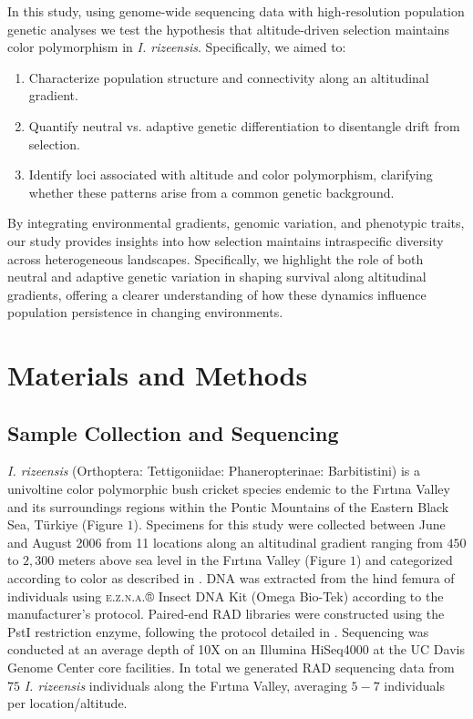 \documentclass[9pt,a4paper,twoside]{rho-class/rho}
\begin{document}
    In this study, using genome-wide sequencing data with high-resolution population genetic analyses we test the hypothesis that altitude-driven selection maintains color polymorphism in \textit{I. rizeensis}. Specifically, we aimed to: 
  
    \begin{enumerate}
    \item Characterize population structure and connectivity along an altitudinal gradient.
    \item Quantify neutral vs. adaptive genetic differentiation to disentangle drift from selection.
    \item Identify loci associated with altitude and color polymorphism, clarifying whether these patterns arise from a common genetic background.
    \end{enumerate}

    By integrating environmental gradients, genomic variation, and phenotypic traits, our study provides insights into how selection maintains intraspecific diversity across heterogeneous landscapes. Specifically, we highlight the role of both neutral and adaptive genetic variation in shaping survival along altitudinal gradients, offering a clearer understanding of how these dynamics influence population persistence in changing environments.

\section{Materials and Methods}

    \subsection{Sample Collection and Sequencing}

       \textit{I. rizeensis} (Orthoptera: Tettigoniidae: Phaneropterinae: Barbitistini) is a univoltine color polymorphic bush cricket species endemic to the Fırtına Valley and its surroundings regions within the Pontic Mountains of the Eastern Black Sea, Türkiye (Figure $1$). Specimens for this study were collected between June and August 2006 from 11 locations along an altitudinal gradient ranging from $450$ to $2,300$ meters above sea level in the Fırtına Valley (Figure $1$) and categorized according to color as described in \cite{Çağlar2014}. DNA was extracted from the hind femura of individuals using \textsc{e.z.n.a.}® Insect DNA Kit (Omega Bio-Tek) according to the manufacturer’s protocol. Paired-end RAD libraries were constructed using the PstI restriction enzyme, following the protocol detailed in \cite{Ali2016}. Sequencing was conducted at an average depth of 10X on an Illumina HiSeq4000 at the UC Davis Genome Center core facilities. In total we generated RAD sequencing data from $75$ \textit{I. rizeensis} individuals along the Fırtına Valley, averaging $5-7$ individuals per location/altitude.
    
\end{document}
